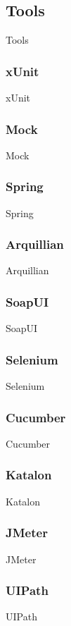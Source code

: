 \subsection{Tools}\label{subsec:tools}
Tools

\subsubsection{xUnit}
xUnit

\subsubsection{Mock}
Mock

\subsubsection{Spring}
Spring

\subsubsection{Arquillian}
Arquillian

\subsubsection{SoapUI}
SoapUI

\subsubsection{Selenium}
Selenium

\subsubsection{Cucumber}
Cucumber

\subsubsection{Katalon}
Katalon

\subsubsection{JMeter}
JMeter

\subsubsection{UIPath}
UIPath
